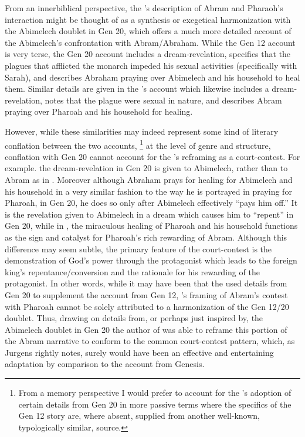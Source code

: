 From an innerbiblical perspective, the \ga's description of Abram and Pharaoh's interaction might be thought of as a synthesis or exegetical harmonization with the Abimelech doublet in Gen 20, which offers a much more detailed account of the Abimelech's confrontation with Abram/Abraham. While the Gen 12 account is very terse, the Gen 20 account includes a dream-revelation, specifies that the plagues that afflicted the monarch impeded his sexual activities (specifically with Sarah), and describes Abraham praying over Abimelech and his household to heal them. Similar details are given in the \ga's account which likewise includes a dream-revelation, notes that the plague were sexual in nature, and describes Abram praying over Pharoah and his household for healing. 

However, while these similarities may indeed represent some kind of literary conflation between the two accounts,%
%
\footnote{From a memory perspective I would prefer to account for the \ga's adoption of certain details from Gen 20 in more passive terms where the specifics of the Gen 12 story are, where absent, supplied from another well-known, typologically similar, source.} 
%
at the level of genre and structure, conflation with Gen 20 cannot account for the \ga's reframing as a court-contest. For example. the dream-revelation in Gen 20 is given to Abimelech, rather than to Abram as in \ga. Moreover although Abraham prays for healing for Abimelech and his household in a very similar fashion to the way he is portrayed in \ga praying for Pharoah, in Gen 20, he does so only after Abimelech effectively ``pays him off.'' It is the revelation given to Abimelech in a dream which causes him to ``repent'' in Gen 20, while in \ga, the miraculous healing of Pharoah and his household functions as the sign and catalyst for Pharoah's rich rewarding of Abram. Although this difference may seem subtle, the primary feature of the court-contest is the demonstration of God's power through the protagonist which leads to the foreign king's repentance/conversion and the rationale for his rewarding of the protagonist. In other words, while it may have been that the \ga used details from Gen 20 to supplement the account from Gen 12, \ga's framing of Abram's contest with Pharoah cannot be solely attributed to a harmonization of the Gen 12/20 doublet. Thus, drawing on details from, or perhaps just inspired by, the Abimelech doublet in Gen 20  the author of \ga was able to reframe this portion of the Abram narrative to conform to the common court-contest pattern, which, as Jurgens rightly notes, surely would have been an effective and entertaining adaptation by comparison to the account from Genesis.

